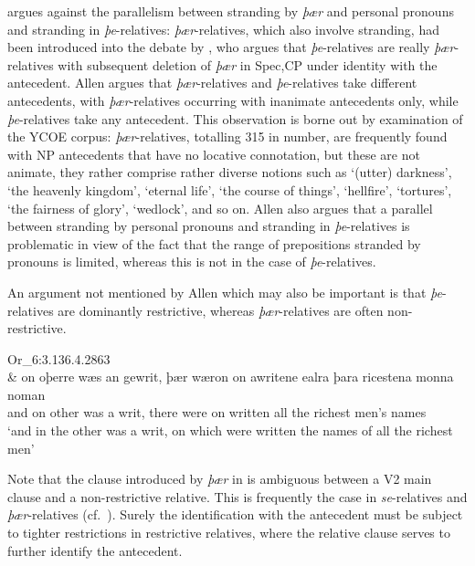 \documentclass[output=paper]{langsci/langscibook}
\begin{document}
\citet{Allen1980} argues against the parallelism between stranding by
\textit{þær} and personal pronouns and stranding in \textit{þe}-relatives:
\textit{þær}-relatives, which also involve stranding, had been introduced into
the debate by \citet{Vat1978}, who argues that \textit{þe}-relatives are really
\textit{þær}-relatives with subsequent deletion of \textit{þær} in Spec,CP
under identity with the antecedent. Allen argues that \textit{þær}-relatives
and \textit{þe}-relatives take different antecedents, with
\textit{þær}-relatives occurring with inanimate antecedents only, while
\textit{þe}-relatives take any antecedent. This observation is borne out by
examination of the YCOE corpus: \textit{þær}-relatives, totalling 315 in
number, are frequently found with NP antecedents that have no locative
connotation, but these are not animate, they rather comprise rather
diverse notions such as \enquote*{(utter) darkness}, \enquote*{the heavenly
kingdom}, \enquote*{eternal life}, \enquote*{the course of things},
\enquote*{hellfire}, \enquote*{tortures}, \enquote*{the fairness of glory},
\enquote*{wedlock}, and so on. Allen also argues that a parallel between
stranding by personal pronouns and stranding in \textit{þe}-relatives is
problematic in view of the fact that the range of prepositions stranded by
pronouns is limited, whereas this is not in the case of
\textit{þe}-relatives.

An argument not mentioned by Allen which may also be important is that
\textit{þe}-relatives are dominantly restrictive, whereas
\textit{þær}-relatives are often non-re\-stric\-tive.

\ea Or\_6:3.136.4.2863%
    \label{ex:11.8}\\
    \gll \& on oþerre wæs an gewrit, þær   wæron on awritene ealra þara ricestena monna noman\\
        and on other   was  a  writ,     there were    on written   all     the    richest men’s  names\\
    \glt ‘and in the other was a writ, on which were written the names of all the richest men’
\z

Note that the clause introduced by \textit{þær} in  is
ambiguous between a V2 main clause and a non-restrictive relative. This is
frequently the case in \textit{se}-relatives and \textit{þær}-relatives (cf.\
\citealt{LosvanKemenade2018}).  Surely the identification with the antecedent
must be subject to tighter restrictions in restrictive relatives, where the
relative clause serves to further identify the antecedent.
\end{document}
